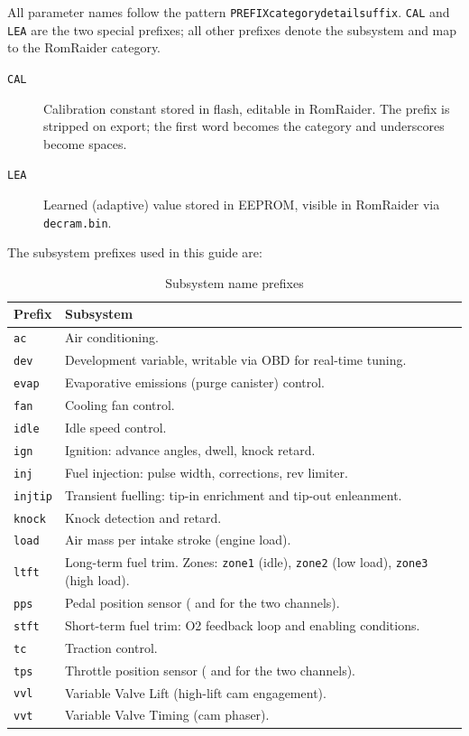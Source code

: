 \documentclass[a4paper,11pt]{article}
\renewcommand{\_}{\oldunderscore\allowbreak}
\begin{document}
All parameter names follow the pattern \texttt{PREFIX\_category\_detail\_suffix}.
\texttt{CAL\_} and \texttt{LEA\_} are the two special prefixes; all other
prefixes denote the subsystem and map to the RomRaider category.

\begin{description}
  \item[\texttt{CAL\_}] Calibration constant stored in flash, editable in
    RomRaider. The prefix is stripped on export; the first word becomes the
    category and underscores become spaces.
  \item[\texttt{LEA\_}] Learned (adaptive) value stored in EEPROM, visible in
    RomRaider via \texttt{decram.bin}.
\end{description}

The subsystem prefixes used in this guide are:

\begin{table}[H]
\centering
\begin{tabular}{lp{10cm}}
\toprule
\textbf{Prefix} & \textbf{Subsystem} \\
\midrule
\texttt{ac\_}      & Air conditioning. \\
\texttt{dev\_}     & Development variable, writable via OBD for real-time tuning. \\
\texttt{evap\_}    & Evaporative emissions (purge canister) control. \\
\texttt{fan\_}     & Cooling fan control. \\
\texttt{idle\_}    & Idle speed control. \\
\texttt{ign\_}     & Ignition: advance angles, dwell, knock retard. \\
\texttt{inj\_}     & Fuel injection: pulse width, corrections, rev limiter. \\
\texttt{injtip\_}  & Transient fuelling: tip-in enrichment and tip-out enleanment. \\
\texttt{knock\_}   & Knock detection and retard. \\
\texttt{load\_}    & Air mass per intake stroke (engine load). \\
\texttt{ltft\_}    & Long-term fuel trim. Zones: \texttt{zone1} (idle), \texttt{zone2} (low load), \texttt{zone3} (high load). \\
\texttt{pps\_}     & Pedal position sensor (\texttt{\_1} and \texttt{\_2} for the two channels). \\
\texttt{stft\_}    & Short-term fuel trim: O2 feedback loop and enabling conditions. \\
\texttt{tc\_}      & Traction control. \\
\texttt{tps\_}     & Throttle position sensor (\texttt{\_1} and \texttt{\_2} for the two channels). \\
\texttt{vvl\_}     & Variable Valve Lift (high-lift cam engagement). \\
\texttt{vvt\_}     & Variable Valve Timing (cam phaser). \\
\bottomrule
\end{tabular}
\caption{Subsystem name prefixes}
\end{table}
\end{document}
